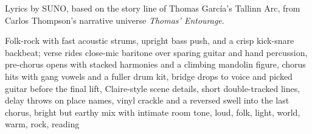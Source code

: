 
\begin{notes}
Lyrics by SUNO, based on the story line of Thomas García's Tallinn Arc, from Carlos Thompson's narrative universe \emph{Thomas’ Entourage}.
\end{notes}
\begin{style}
Folk-rock with fast acoustic strums, upright bass push, and a crisp kick-snare backbeat; verse rides close-mic baritone over sparing guitar and hand percussion, pre-chorus opens with stacked harmonies and a climbing mandolin figure, chorus hits with gang vowels and a fuller drum kit, bridge drops to voice and picked guitar before the final lift, Claire-style scene details, short double-tracked lines, delay throws on place names, vinyl crackle and a reversed swell into the last chorus, bright but earthy mix with intimate room tone, loud, folk, light, world, warm, rock, reading
\end{style}
